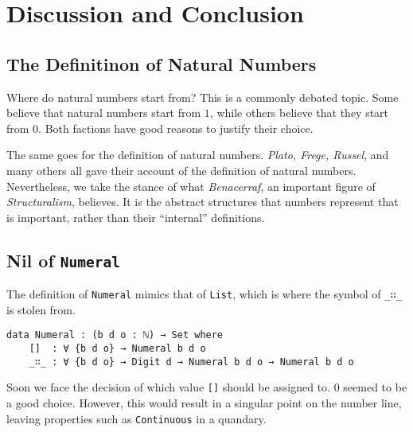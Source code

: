 \documentclass[\main/thesis.tex]{subfiles}
\begin{document}
\chapter{Discussion and Conclusion}\label{conclusion}

\section{The Definitinon of Natural Numbers}

Where do natural numbers start from?
This is a commonly debated topic.
Some believe that natural numbers start from $ 1 $,
while others believe that they start from $ 0 $.
Both factions have good reasons to justify their choice.

The same goes for the definition of natural numbers.
\textit{Plato, Frege, Russel}, and many others all gave their account of the
definition of natural numbers.
Nevertheless, we take the stance of what \textit{Benacerraf},
an important figure of \textit{Structuralism}, believes\cite{benacerraf1965numbers}.
It is the abstract structures that numbers represent that is important,
rather than their ``internal'' definitions.

\section{Nil of \lstinline|Numeral|}

The definition of \lstinline|Numeral| mimics that of \lstinline|List|,
which is where the symbol of \lstinline|_∷_| is stolen from.

\begin{lstlisting}[basicstyle=\ttfamily\scriptsize]
data Numeral : (b d o : ℕ) → Set where
    []  : ∀ {b d o} → Numeral b d o
    _∷_ : ∀ {b d o} → Digit d → Numeral b d o → Numeral b d o
\end{lstlisting}

Soon we face the decision of which value \lstinline|[]| should be assigned to.
$ 0 $ seemed to be a good choice.
However, this would result in a singular point on the number line,
leaving properties such as \lstinline|Continuous| in a quandary.

\begin{center}
    \begin{adjustbox}{max width=\textwidth}
    \end{adjustbox}
\end{center}
\end{document}
